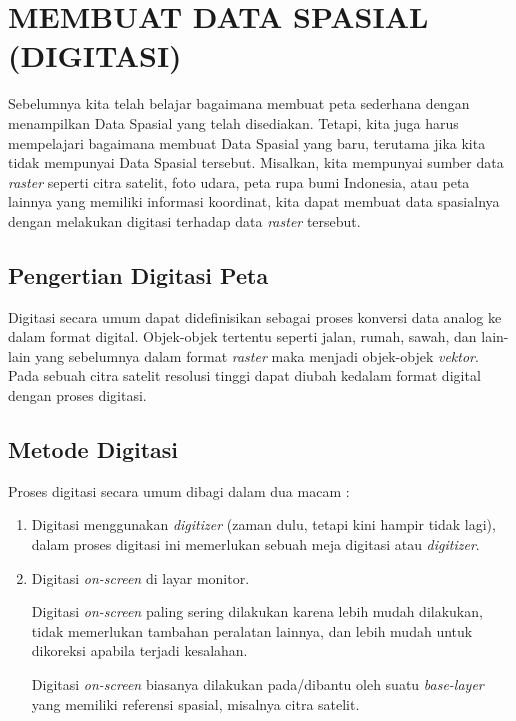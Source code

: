\chapter{MEMBUAT DATA SPASIAL (DIGITASI)}

Sebelumnya kita telah belajar bagaimana membuat peta sederhana dengan menampilkan Data Spasial yang telah disediakan. Tetapi, kita juga harus mempelajari bagaimana membuat Data Spasial yang baru, terutama jika kita tidak mempunyai Data Spasial tersebut. Misalkan, kita mempunyai sumber data \textit{raster} seperti citra satelit, foto udara, peta rupa bumi Indonesia, atau peta lainnya yang memiliki informasi koordinat, kita dapat membuat data spasialnya dengan melakukan digitasi terhadap data \textit{raster} tersebut.

\section{Pengertian Digitasi Peta}

Digitasi secara umum dapat didefinisikan sebagai proses konversi data analog ke dalam format digital. Objek-objek tertentu seperti jalan, rumah, sawah, dan lain-lain yang sebelumnya dalam format \textit{raster} maka menjadi objek-objek \textit{vektor}. Pada sebuah citra satelit resolusi tinggi dapat diubah kedalam format digital dengan proses digitasi.

\section{Metode Digitasi}

Proses digitasi secara umum dibagi dalam dua macam :

\begin{enumerate}[1.]

  \item Digitasi menggunakan \textit{digitizer} (zaman dulu, tetapi kini hampir tidak lagi), dalam proses digitasi ini memerlukan sebuah meja digitasi atau \textit{digitizer}.
  
  \item Digitasi \textit{on-screen} di layar monitor.
  
  Digitasi \textit{on-screen} paling sering dilakukan karena lebih mudah dilakukan, tidak memerlukan tambahan peralatan lainnya, dan lebih mudah untuk dikoreksi apabila terjadi kesalahan.
  
  Digitasi \textit{on-screen} biasanya dilakukan pada/dibantu oleh suatu \textit{base-layer} yang memiliki referensi spasial, misalnya citra satelit.

\end{enumerate}


